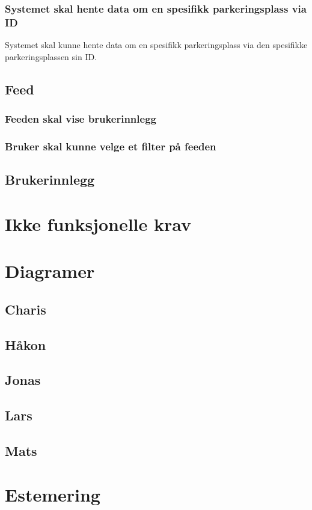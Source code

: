 \documentclass[12pt]{article}
\begin{document}
\subsubsection{Systemet skal hente data om en spesifikk parkeringsplass via ID}
Systemet skal kunne hente data om en spesifikk parkeringsplass via den spesifikke parkeringsplassen sin ID.

\subsection{Feed}

\subsubsection{Feeden skal vise brukerinnlegg}

\subsubsection{Bruker skal kunne velge et filter på feeden}

\subsection{Brukerinnlegg}

\section{Ikke funksjonelle krav}


\section{Diagramer}

\subsection{Charis}

\subsection{Håkon}

\subsection{Jonas}

\subsection{Lars}

\subsection{Mats}

\section{Estemering}
\end{document}
